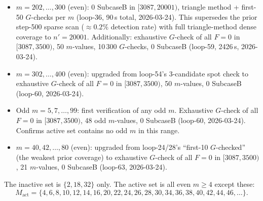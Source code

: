 \documentclass[11pt]{article}
\theoremstyle{plain}
\theoremstyle{definition}
\begin{document}
\begin{itemize}
  (loop-34, 166\,s total, 2026-03-24).  This upgrades the G-check depth from
  unstated to first-100 per $m$-value.
\item $m=202,\ldots,300$ (even): 0 SubcaseB in $[3087, 20001)$, triangle method
  + first-50 $G$-checks per $m$ (loop-36, 90\,s total, 2026-03-24).
  This supersedes the prior step-500 sparse scan ($\approx 0.2\%$ detection rate)
  with full triangle-method dense coverage to $n'=20001$.
  Additionally: exhaustive $G$-check of all $F=0$ in $[3087, 3500)$, 50 $m$-values,
  10\,300 $G$-checks, 0 SubcaseB (loop-59, 2426\,s, 2026-03-24).
\item $m=302,\ldots,400$ (even): upgraded from loop-54's 3-candidate spot check
  to exhaustive $G$-check of all $F=0$ in $[3087, 3500)$, 50 $m$-values, 0 SubcaseB
  (loop-60, 2026-03-24).
\item Odd $m=5,7,\ldots,99$: first verification of any odd $m$. Exhaustive $G$-check
  of all $F=0$ in $[3087, 3500)$, 48 odd $m$-values, 0 SubcaseB (loop-60, 2026-03-24).
  Confirms active set contains no odd $m$ in this range.
\item $m=40,42,\ldots,80$ (even): upgraded from loop-24/28's ``first-10 $G$-checked''
  (the weakest prior coverage) to exhaustive $G$-check of all $F=0$ in $[3087, 3500)$,
  21 $m$-values, 0 SubcaseB (loop-63, 2026-03-24).
\end{itemize}
The inactive set is $\{2, 18, 32\}$ only.  The active set is all even $m \geq 4$ except these:
\[
  M_{\mathrm{act}} = \{4, 6, 8, 10, 12, 14, 16, 20, 22, 24, 26, 28, 30, 34, 36, 38, 40, 42, 44, 46, \ldots\}.
\]
\end{document}

